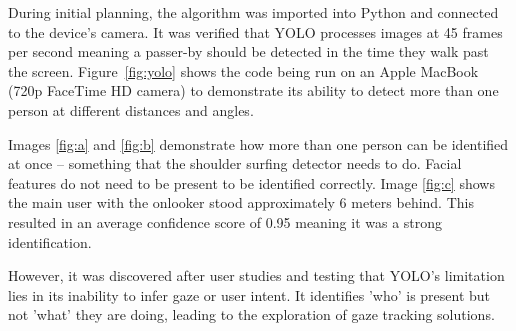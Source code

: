 \documentclass[12pt]{article}
\theoremstyle{plain}
\theoremstyle{definition}
\begin{document}
During initial planning, the algorithm was imported into Python and connected to the device’s camera. It was verified that YOLO processes images at 45 frames per second \cite{redmon_you_2016} meaning a passer-by should be detected in the time they walk past the screen. Figure~\ref{fig:yolo} shows the code being run on an Apple MacBook (720p FaceTime HD camera) to demonstrate its ability to detect more than one person at different distances and angles.

Images \ref{fig:a} and \ref{fig:b} demonstrate how more than one person can be identified at once – something that the shoulder surfing detector needs to do. Facial features do not need to be present to be identified correctly. Image \ref{fig:c} shows the main user with the onlooker stood approximately 6 meters behind. This resulted in an average confidence score of 0.95 meaning it was a strong identification.

However, it was discovered after user studies and testing that YOLO's limitation lies in its inability to infer gaze or user intent. It identifies 'who' is present but not 'what' they are doing, leading to the exploration of gaze tracking solutions.
\end{document}
